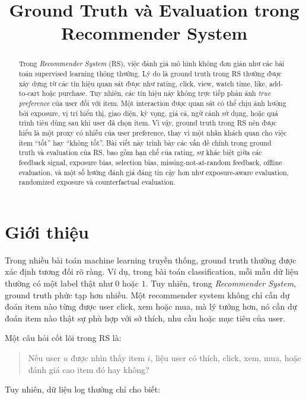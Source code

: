 \documentclass[12pt,a4paper]{article}
\title{\textbf{Ground Truth và Evaluation trong Recommender System}}
\author{}
\date{}
\begin{document}
\maketitle

\begin{abstract}
Trong \textit{Recommender System} (RS), việc đánh giá mô hình không đơn giản như các bài toán supervised learning thông thường. 
Lý do là ground truth trong RS thường được xây dựng từ các tín hiệu quan sát được như rating, click, view, watch time, like, add-to-cart hoặc purchase. 
Tuy nhiên, các tín hiệu này không trực tiếp phản ánh \textit{true preference} của user đối với item. 
Một interaction được quan sát có thể chịu ảnh hưởng bởi exposure, vị trí hiển thị, giao diện, kỳ vọng, giá cả, ngữ cảnh sử dụng, hoặc quá trình tiêu dùng sau khi user đã chọn item. 
Vì vậy, ground truth trong RS nên được hiểu là một proxy có nhiễu của user preference, thay vì một nhãn khách quan cho việc item ``tốt'' hay ``không tốt''. 
Bài viết này trình bày các vấn đề chính trong ground truth và evaluation của RS, bao gồm hạn chế của rating, sự khác biệt giữa các feedback signal, exposure bias, selection bias, missing-not-at-random feedback, offline evaluation, và một số hướng đánh giá đáng tin cậy hơn như exposure-aware evaluation, randomized exposure và counterfactual evaluation.
\end{abstract}

\section{Giới thiệu}

Trong nhiều bài toán machine learning truyền thống, ground truth thường được xác định tương đối rõ ràng. 
Ví dụ, trong bài toán classification, mỗi mẫu dữ liệu thường có một label thật như $0$ hoặc $1$. 
Tuy nhiên, trong \textit{Recommender System}, ground truth phức tạp hơn nhiều. 
Một recommender system không chỉ cần dự đoán item nào từng được user click, xem hoặc mua, mà lý tưởng hơn, nó cần dự đoán item nào thật sự phù hợp với sở thích, nhu cầu hoặc mục tiêu của user.

Một câu hỏi cốt lõi trong RS là:

\begin{quote}
Nếu user $u$ được nhìn thấy item $i$, liệu user có thích, click, xem, mua, hoặc đánh giá cao item đó hay không?
\end{quote}

Tuy nhiên, dữ liệu log thường chỉ cho biết:
\end{document}
